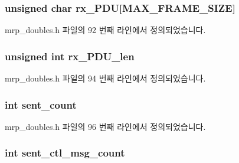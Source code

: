 \subsubsection[{\texorpdfstring{rx\+\_\+\+P\+DU}{rx_PDU}}]{\setlength{\rightskip}{0pt plus 5cm}unsigned char rx\+\_\+\+P\+DU\mbox{[}{\bf M\+A\+X\+\_\+\+F\+R\+A\+M\+E\+\_\+\+S\+I\+ZE}\mbox{]}}\hypertarget{structmrpd__test__state_aa86c1661ac8500782d7ad1ca6c1eb3d7}{}\label{structmrpd__test__state_aa86c1661ac8500782d7ad1ca6c1eb3d7}


mrp\+\_\+doubles.\+h 파일의 92 번째 라인에서 정의되었습니다.

\subsubsection[{\texorpdfstring{rx\+\_\+\+P\+D\+U\+\_\+len}{rx_PDU_len}}]{\setlength{\rightskip}{0pt plus 5cm}unsigned int rx\+\_\+\+P\+D\+U\+\_\+len}\hypertarget{structmrpd__test__state_a05f2959f886f1637960fd7be3a7da392}{}\label{structmrpd__test__state_a05f2959f886f1637960fd7be3a7da392}


mrp\+\_\+doubles.\+h 파일의 94 번째 라인에서 정의되었습니다.

\subsubsection[{\texorpdfstring{sent\+\_\+count}{sent_count}}]{\setlength{\rightskip}{0pt plus 5cm}int sent\+\_\+count}\hypertarget{structmrpd__test__state_a91c97751cd15e145929c848d6ba03ff0}{}\label{structmrpd__test__state_a91c97751cd15e145929c848d6ba03ff0}


mrp\+\_\+doubles.\+h 파일의 96 번째 라인에서 정의되었습니다.

\subsubsection[{\texorpdfstring{sent\+\_\+ctl\+\_\+msg\+\_\+count}{sent_ctl_msg_count}}]{\setlength{\rightskip}{0pt plus 5cm}int sent\+\_\+ctl\+\_\+msg\+\_\+count}\hypertarget{structmrpd__test__state_a22276d4ca2a7dc05332e212db7f2134e}{}\label{structmrpd__test__state_a22276d4ca2a7dc05332e212db7f2134e}



